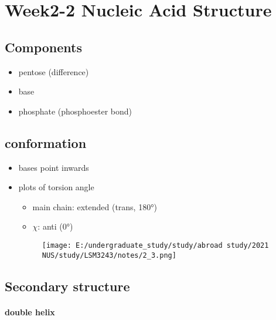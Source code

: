 \chapter{Week2-2 Nucleic Acid Structure}

\begin{introduction}
    \item 
\end{introduction}

\hypertarget{component}{%
\section{Components}\label{component}}

\begin{itemize}
\item
pentose (difference)
\item
base
\item
phosphate (phosphoester bond)
\end{itemize}

\hypertarget{conformation}{%
\section{conformation}\label{conformation}}

\begin{itemize}
\item
bases point inwards
\item
plots of torsion angle

\begin{itemize}
	\item
	main chain: extended (trans, \ang{180})
	\item
	\(\chi\): anti (\ang{0})
\end{itemize}

\begin{figure}
	\centering
	\texttt{[image: E:/undergraduate\_study/study/abroad study/2021 NUS/study/LSM3243/notes/2\_3.png]}
\end{figure}
\end{itemize}

\hypertarget{secondary-structure}{%
\section{Secondary structure}\label{secondary-structure}}

\hypertarget{double-helix}{%
\subsubsection{double helix}\label{double-helix}}

